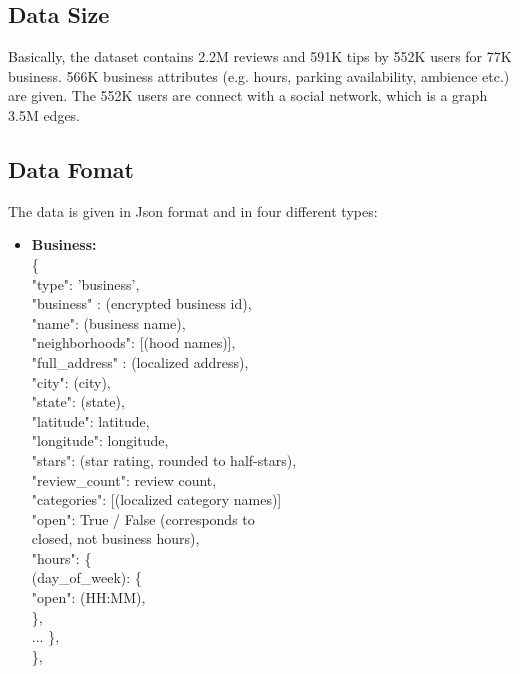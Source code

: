 \documentclass{article}
\newcommand\tab[1][1cm]{\hspace*{#1}}
\begin{document}
\subsection{Data Size}
Basically, the dataset contains 2.2M reviews and 591K tips by 552K users for 77K business.
566K business attributes (e.g. hours, parking availability, ambience etc.) are given.
The 552K users are connect with a social network, which is a graph 3.5M edges.

\subsection{Data Fomat}
The data is given in Json format and in four different types:

\begin{itemize}
\item \textbf{Business:}
\\ \{
\\ \tab   "type": 'business',
\\ \tab "business" : (encrypted business id),
\\ \tab "name": (business name),
\\ \tab "neighborhoods": [(hood names)],
\\ \tab "full\_address" : (localized address),
\\ \tab    "city": (city),
\\ \tab    "state": (state),
\\ \tab    "latitude": latitude,
\\ \tab    "longitude": longitude,
\\ \tab    "stars": (star rating, rounded to half-stars),
\\ \tab    "review\_count": review count,
\\ \tab    "categories": [(localized category names)]
\\ \tab    "open": True / False (corresponds to
\\ \tab      closed, not business hours),
\\ \tab    "hours": \{
\\ \tab        (day\_of\_week): \{
\\ \tab            "open": (HH:MM),
\\ \tab \},
\\ \tab... \},
\\ \},



\end{itemize}
\end{document}
